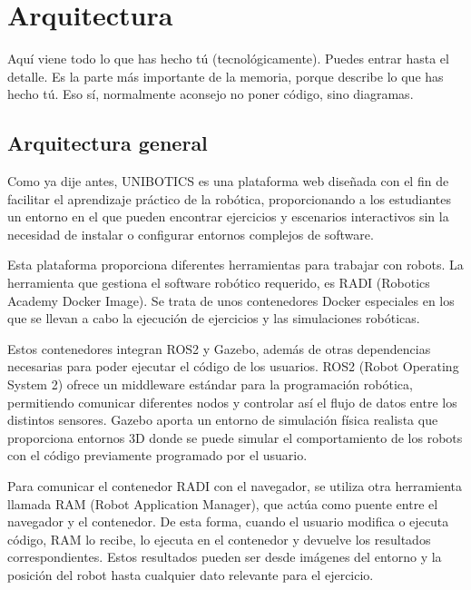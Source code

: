 \documentclass[a4paper, 12pt]{book}
\begin{document}
\cleardoublepage


\chapter{Arquitectura}
\label{chap:diseño}


Aquí viene todo lo que has hecho tú (tecnológicamente). 
Puedes entrar hasta el detalle. 
Es la parte más importante de la memoria, porque describe lo que has hecho tú.
Eso sí, normalmente aconsejo no poner código, sino diagramas.

\section{Arquitectura general} 
\label{sec:arquitectura}

Como ya dije antes, UNIBOTICS es una plataforma web diseñada con el fin de facilitar el aprendizaje práctico de la robótica, proporcionando a los estudiantes un entorno en el que pueden encontrar ejercicios y escenarios interactivos sin la necesidad de instalar o configurar entornos complejos de software.

Esta plataforma proporciona diferentes herramientas para trabajar con robots. La herramienta que gestiona el software robótico requerido, es RADI (Robotics Academy Docker Image). Se trata de unos contenedores Docker especiales en los que se llevan a cabo la ejecución de ejercicios y las simulaciones robóticas.

Estos contenedores integran ROS2 y Gazebo, además de otras dependencias necesarias para poder ejecutar el código de los usuarios. ROS2 (Robot Operating System 2) ofrece un middleware estándar para la programación robótica, permitiendo comunicar diferentes nodos y controlar así el flujo de datos entre los distintos sensores. Gazebo aporta un entorno de simulación física realista que proporciona entornos 3D donde se puede simular el comportamiento de los robots con el código previamente programado por el usuario.

Para comunicar el contenedor RADI con el navegador, se utiliza otra herramienta llamada RAM (Robot Application Manager), que actúa como puente entre el navegador y el contenedor. De esta forma, cuando el usuario modifica o ejecuta código, RAM lo recibe, lo ejecuta en el contenedor y devuelve los resultados correspondientes. Estos resultados pueden ser desde imágenes del entorno y la posición del robot hasta cualquier dato relevante para el ejercicio.
\end{document}
